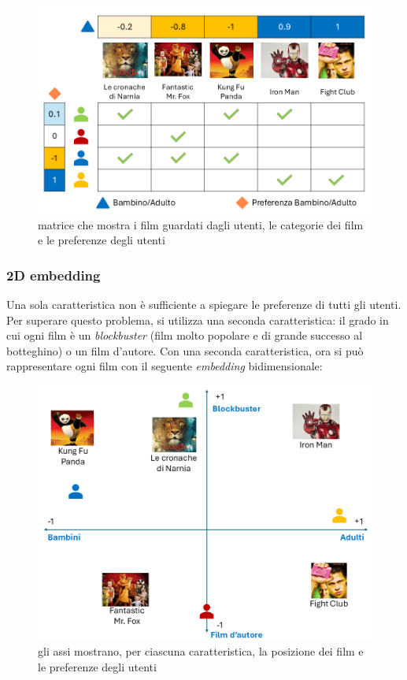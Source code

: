 \begin{figure}[H]
    \centering
    \includegraphics[scale=0.5]{figures/collaborative_filtering/1D_matrix.PNG}
    \caption{matrice che mostra i film guardati dagli utenti, le categorie dei film e le preferenze degli utenti}
    \label{fig:1D_matrix}
\end{figure}

\subsubsection{2D embedding}

Una sola caratteristica non è sufficiente a spiegare le preferenze di tutti gli utenti. Per superare questo problema, si utilizza una seconda caratteristica: il grado in cui ogni film è un \textit{blockbuster} (film molto popolare e di grande successo al botteghino) o un film d'autore. Con una seconda caratteristica, ora si può rappresentare ogni film con il seguente \textit{embedding} bidimensionale:

\begin{figure}[H]
    \centering
    \includegraphics[scale=0.4]{figures/collaborative_filtering/axes.PNG}
    \caption{gli assi mostrano, per ciascuna caratteristica, la posizione dei film e le preferenze degli utenti}
    \label{fig:embedding_axes}
\end{figure}

